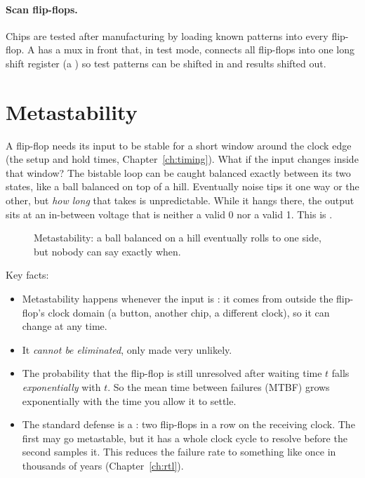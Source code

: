 \paragraph{Scan flip-flops.} Chips are tested after manufacturing by loading known patterns into every flip-flop. A  has a mux in front that, in test mode, connects all flip-flops into one long shift register (a ) so test patterns can be shifted in and results shifted out.

\section{Metastability}
\label{sec:metastability}

A flip-flop needs its input to be stable for a short window around the clock edge (the setup and hold times, Chapter~\ref{ch:timing}). What if the input changes inside that window? The bistable loop can be caught balanced exactly between its two states, like a ball balanced on top of a hill. Eventually noise tips it one way or the other, but \emph{how long} that takes is unpredictable. While it hangs there, the output sits at an in-between voltage that is neither a valid 0 nor a valid 1. This is .

\begin{figure}[h]
\centering
{}
\caption{Metastability: a ball balanced on a hill eventually rolls to one side, but nobody can say exactly when.}
\end{figure}

Key facts:
\begin{itemize}
  \item Metastability happens whenever the input is : it comes from outside the flip-flop's clock domain (a button, another chip, a different clock), so it can change at any time.
  \item It \emph{cannot be eliminated}, only made very unlikely.
  \item The probability that the flip-flop is still unresolved after waiting time $t$ falls \emph{exponentially} with $t$. So the mean time between failures (MTBF) grows exponentially with the time you allow it to settle.
  \item The standard defense is a : two flip-flops in a row on the receiving clock. The first may go metastable, but it has a whole clock cycle to resolve before the second samples it. This reduces the failure rate to something like once in thousands of years (Chapter~\ref{ch:rtl}).
\end{itemize}

